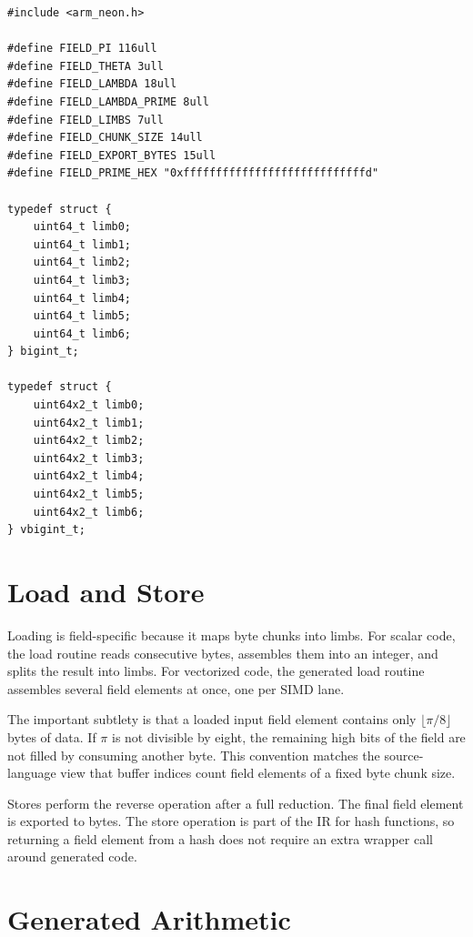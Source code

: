 \begin{lstlisting}[style=thesisC,basicstyle=\scriptsize\ttfamily,caption={Generated scalar and vectorized field-element data structures.},label={lst:generated-structs}]
#include <arm_neon.h>

#define FIELD_PI 116ull
#define FIELD_THETA 3ull
#define FIELD_LAMBDA 18ull
#define FIELD_LAMBDA_PRIME 8ull
#define FIELD_LIMBS 7ull
#define FIELD_CHUNK_SIZE 14ull
#define FIELD_EXPORT_BYTES 15ull
#define FIELD_PRIME_HEX "0xffffffffffffffffffffffffffffd"

typedef struct {
    uint64_t limb0;
    uint64_t limb1;
    uint64_t limb2;
    uint64_t limb3;
    uint64_t limb4;
    uint64_t limb5;
    uint64_t limb6;
} bigint_t;

typedef struct {
    uint64x2_t limb0;
    uint64x2_t limb1;
    uint64x2_t limb2;
    uint64x2_t limb3;
    uint64x2_t limb4;
    uint64x2_t limb5;
    uint64x2_t limb6;
} vbigint_t;
\end{lstlisting}

\section{Load and Store}
\label{sec:load-store}

Loading is field-specific because it maps byte chunks into limbs. For scalar code, the load routine reads consecutive bytes, assembles them into an integer, and splits the result into limbs. For vectorized code, the generated load routine assembles several field elements at once, one per SIMD lane.

The important subtlety is that a loaded input field element contains only \(\lfloor \pi/8\rfloor\) bytes of data. If \(\pi\) is not divisible by eight, the remaining high bits of the field are not filled by consuming another byte. This convention matches the source-language view that buffer indices count field elements of a fixed byte chunk size.

Stores perform the reverse operation after a full reduction. The final field element is exported to bytes. The store operation is part of the IR for hash functions, so returning a field element from a hash does not require an extra wrapper call around generated code.

\section{Generated Arithmetic}
\label{sec:generated-arithmetic}

